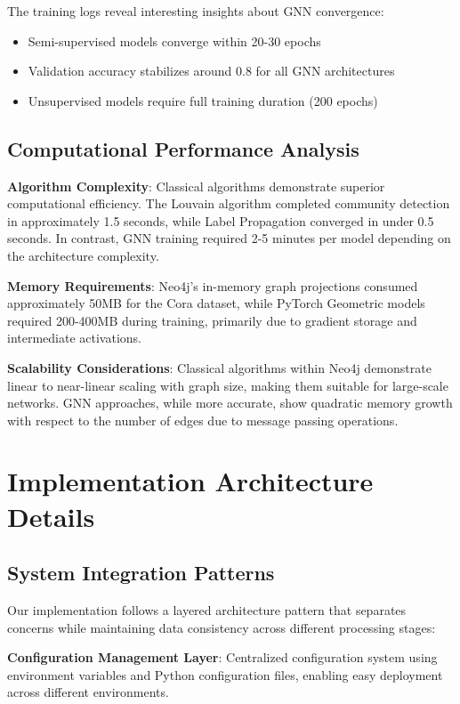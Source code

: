 \documentclass[conference]{IEEEtran}
\begin{document}
The training logs reveal interesting insights about GNN convergence:
\begin{itemize}
    \item Semi-supervised models converge within 20-30 epochs
    \item Validation accuracy stabilizes around 0.8 for all GNN architectures
    \item Unsupervised models require full training duration (200 epochs)
\end{itemize}

\subsection{Computational Performance Analysis}

\textbf{Algorithm Complexity}: Classical algorithms demonstrate superior computational efficiency. The Louvain algorithm completed community detection in approximately 1.5 seconds, while Label Propagation converged in under 0.5 seconds. In contrast, GNN training required 2-5 minutes per model depending on the architecture complexity.

\textbf{Memory Requirements}: Neo4j's in-memory graph projections consumed approximately 50MB for the Cora dataset, while PyTorch Geometric models required 200-400MB during training, primarily due to gradient storage and intermediate activations.

\textbf{Scalability Considerations}: Classical algorithms within Neo4j demonstrate linear to near-linear scaling with graph size, making them suitable for large-scale networks. GNN approaches, while more accurate, show quadratic memory growth with respect to the number of edges due to message passing operations.

\section{Implementation Architecture Details}

\subsection{System Integration Patterns}

Our implementation follows a layered architecture pattern that separates concerns while maintaining data consistency across different processing stages:

\textbf{Configuration Management Layer}: Centralized configuration system using environment variables and Python configuration files, enabling easy deployment across different environments.
\end{document}
